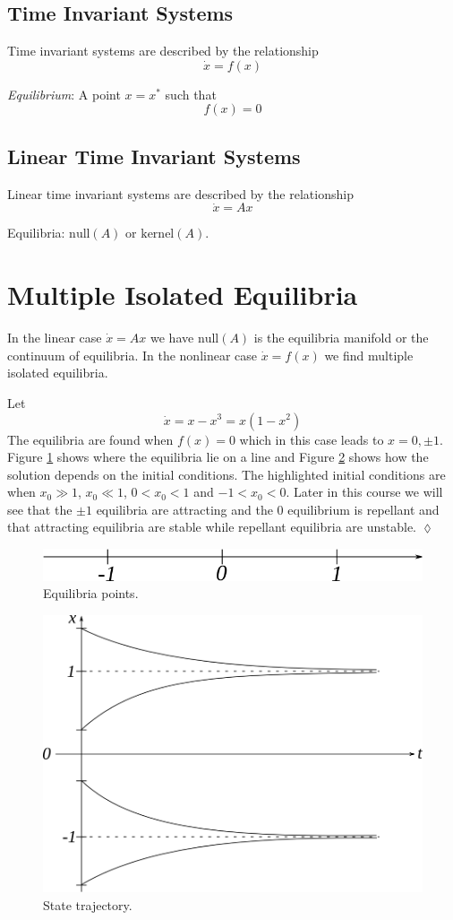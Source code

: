 \subsection{Time Invariant Systems}
Time invariant systems are described by the relationship
$$\dot{x}=f(x)$$
\begin{definition}
\textit{Equilibrium}: A point $x=x^\ast$ such that
$$f(x) = 0$$
\end{definition}

\subsection{Linear Time Invariant Systems}
Linear time invariant systems are described by the relationship
$$\dot{x}=Ax$$
\begin{definition}
Equilibria: $\text{null}(A)$ or $\text{kernel}(A)$.
\end{definition}

\section{Multiple Isolated Equilibria}
In the linear case $\dot{x}=Ax$ we have $\text{null}(A)$ is the equilibria manifold or the continuum of equilibria. In the nonlinear case $\dot{x}=f(x)$ we find multiple isolated equilibria.
\begin{example}
Let
$$\dot{x} = x-x^3 = x(1-x^2)$$
The equilibria are found when $f(x)=0$ which in this case leads to $x=0,\pm1$. Figure \ref{fig:01roots} shows where the equilibria lie on a line and Figure \ref{fig:01traj} shows how the solution depends on the initial conditions. The highlighted initial conditions are when $x_0\gg1$, $x_0\ll1$, $0<x_0<1$ and $-1<x_0<0$. Later in this course we will see that the $\pm1$ equilibria are attracting and the $0$ equilibrium is repellant and that attracting equilibria are stable while repellant equilibria are unstable.
$\lozenge$
\end{example}

\begin{figure}[ht!]
	\centering
	\includegraphics[width=.4\textwidth]{images/01roots}
	\caption{Equilibria points.}
	\label{fig:01roots}
\end{figure}

\begin{figure}[ht!]
	\centering
	\includegraphics[width=.4\textwidth]{images/01traj}
	\caption{State trajectory.}
	\label{fig:01traj}
\end{figure}

